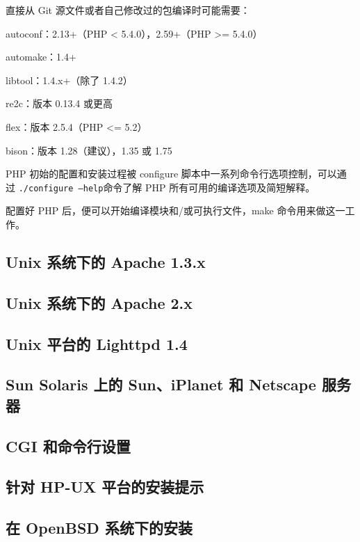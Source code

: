 直接从 Git 源文件或者自己修改过的包编译时可能需要：

\begin{compactitem}
\item autoconf：2.13+（PHP < 5.4.0），2.59+（PHP >= 5.4.0）
\item automake：1.4+
\item libtool：1.4.x+（除了 1.4.2）
\item re2c：版本 0.13.4 或更高
\item flex：版本 2.5.4（PHP <= 5.2）
\item bison：版本 1.28（建议），1.35 或 1.75
\end{compactitem}

PHP 初始的配置和安装过程被 configure 脚本中一系列命令行选项控制，可以通过 \texttt{./configure --help}命令了解 PHP 所有可用的编译选项及简短解释。

配置好 PHP 后，便可以开始编译模块和/或可执行文件，make 命令用来做这一工作。


\subsection{Unix 系统下的 Apache 1.3.x}


\subsection{Unix 系统下的 Apache 2.x}


\subsection{Unix 平台的 Lighttpd 1.4}


\subsection{Sun Solaris 上的 Sun、iPlanet 和 Netscape 服务器}


\subsection{CGI 和命令行设置}


\subsection{针对 HP-UX 平台的安装提示}


\subsection{在 OpenBSD 系统下的安装}


